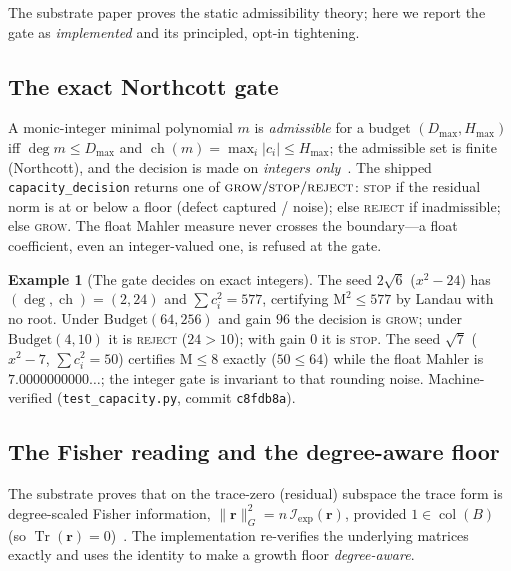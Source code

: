 \documentclass[11pt]{article}
\theoremstyle{plain}
\theoremstyle{definition}
\newtheorem{example}[theorem]{Example}
\theoremstyle{remark}
\newcommand{\Tr}{\operatorname{Tr}}
\newcommand{\Mah}{\mathrm{M}}
\newcommand{\Fish}{\mathcal{I}}
\newcommand{\rr}{\mathbf{r}}
\newcommand{\GG}{G}
\newcommand{\BB}{B}
\DeclareMathOperator{\col}{col}
\DeclareMathOperator{\ch}{ch}
\begin{document}
The substrate paper proves the static admissibility theory; here we report the gate as \emph{implemented} and
its principled, opt-in tightening.

\subsection{The exact Northcott gate}
A monic-integer minimal polynomial $m$ is \emph{admissible} for a budget $(D_{\max},H_{\max})$ iff
$\deg m\le D_{\max}$ and $\ch(m)=\max_i|c_i|\le H_{\max}$; the admissible set is finite (Northcott), and the
decision is made on \emph{integers only}~\cite[Prop.~5.5]{VectorSubstrate}. The shipped
\texttt{capacity\_decision} returns one of $\textsc{grow}/\textsc{stop}/\textsc{reject}$: \textsc{stop} if the
residual norm is at or below a floor (defect captured / noise); else \textsc{reject} if inadmissible; else
\textsc{grow}. The float Mahler measure never crosses the boundary---a float coefficient, even an
integer-valued one, is refused at the gate.

\begin{example}[The gate decides on exact integers]\label{ex:gate}
The seed $2\sqrt6$ ($x^2-24$) has $(\deg,\ch)=(2,24)$ and $\sum c_i^2=577$, certifying $\Mah^2\le577$ by
Landau with no root. Under $\mathrm{Budget}(64,256)$ and gain $96$ the decision is \textsc{grow}; under
$\mathrm{Budget}(4,10)$ it is \textsc{reject} ($24>10$); with gain $0$ it is \textsc{stop}. The seed $\sqrt7$
($x^2-7$, $\sum c_i^2=50$) certifies $\Mah\le8$ exactly ($50\le64$) while the float Mahler is
$7.0000000000\ldots$; the integer gate is invariant to that rounding noise. Machine-verified
(\texttt{test\_capacity.py}, commit \texttt{c8fdb8a}).
\end{example}

\subsection{The Fisher reading and the degree-aware floor}
The substrate proves that on the trace-zero (residual) subspace the trace form is degree-scaled Fisher
information, $\lVert\rr\rVert_\GG^2=n\,\Fish_{\mathrm{exp}}(\rr)$, provided $1\in\col(\BB)$
(so $\Tr(\rr)=0$)~\cite[Lem.~7.9, Thm.~7.11]{VectorSubstrate}. The implementation re-verifies the underlying
matrices exactly and uses the identity to make a growth floor \emph{degree-aware}.
\end{document}
